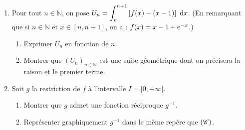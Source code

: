 \begin{enumerate}
\begin{enumerate}
                  \end{enumerate}
            \item Pour tout $n \in \mathbb{N}$, on pose 
                  $\displaystyle{
                        U_n = \int_{n}^{n+1} \left[ f(x) - (x-1) \right] ~\mathrm{d}x}$.
                  (En remarquant que si $n \in \mathbb{N}$ et $x \in [n , n+1]$, on a : $f(x) = x - 1 + \mathrm{e}^{-x}$.)
                  \begin{enumerate}
                        \item Exprimer $U_n$ en fonction de $n$.
                        \item Montrer que $(U_n)_{n\in\mathbb{N}}$ est une suite g\'eom\'etrique dont on pr\'ecisera la raison
                              et le premier terme.
                  \end{enumerate}
            \item Soit $g$ la restriction de $f$ \`a l'intervalle $I = [0,+\infty[$.
                  \begin{enumerate}
                        \item Montrer que $g$ admet une fonction r\'eciproque $g^{-1}$.
                        \item Repr\'esenter graphiquement $g^{-1}$ dans le m\^eme rep\`ere que $(\mathscr{C})$.
                  \end{enumerate}
      \end{enumerate}








